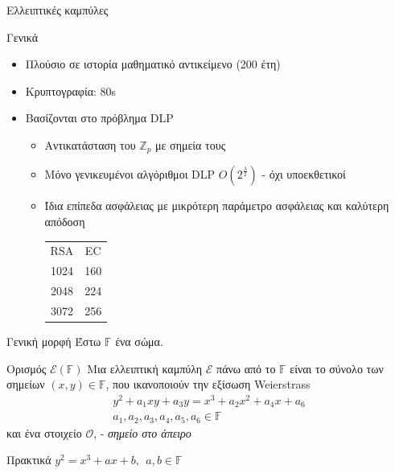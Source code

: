 \documentclass[handout]{beamer}
\begin{document}
\begin{frame}{Ελλειπτικές καμπύλες}
\begin{block}{Γενικά}
\begin{itemize}
\item Πλούσιο σε ιστορία μαθηματικό αντικείμενο (200 έτη) \pause
\item Κρυπτογραφία: 80s \pause
\item Βασίζονται στο πρόβλημα DLP \pause
\begin{itemize}
\item Αντικατάσταση του $\mathbb{Z}_{p}$ με σημεία τους \pause
\item Μόνο γενικευμένοι αλγόριθμοι DLP $O(2^\frac{\lambda}{2})$ - όχι υποεκθετικοί \pause
\item Ίδια επίπεδα ασφάλειας με μικρότερη παράμετρο ασφάλειας και καλύτερη απόδοση\\
\begin{tabular}{cc}
RSA & EC \\
1024 & 160 \\
2048 & 224 \\
3072 & 256 \\
\end{tabular}
\end{itemize}
\end{itemize}
\end{block}
\end{frame}

\begin{frame}{Γενική μορφή}
Έστω $\mathbb F$ ένα σώμα.
\pause
\begin{block}{Ορισμός $\mathcal{E}(\mathbb{F})$}
Mια ελλειπτική καμπύλη $\mathcal{E}$ πάνω από το $\mathbb F$ είναι το σύνολο των σημείων  $(x,y) \in \mathbb F$, που ικανοποιούν την εξίσωση Weierstrass 
\begin{align*}
y^2+a_1xy+a_3y=x^3+a_2x^2+a_4x+a_6 \\  a_1, a_2, a_3, a_4, a_5, a_6 \in \mathbb{F}
\end{align*}  
 και  ένα στοιχείο $\mathcal O$, - \emph{σημείο στο άπειρο}
\end{block}
\pause
\begin{block}{Πρακτικά} 
$
y^2=x^3+ax+b ,\ \ a, b \in \mathbb F\  
$

\end{block}
\end{frame}
\end{document}
